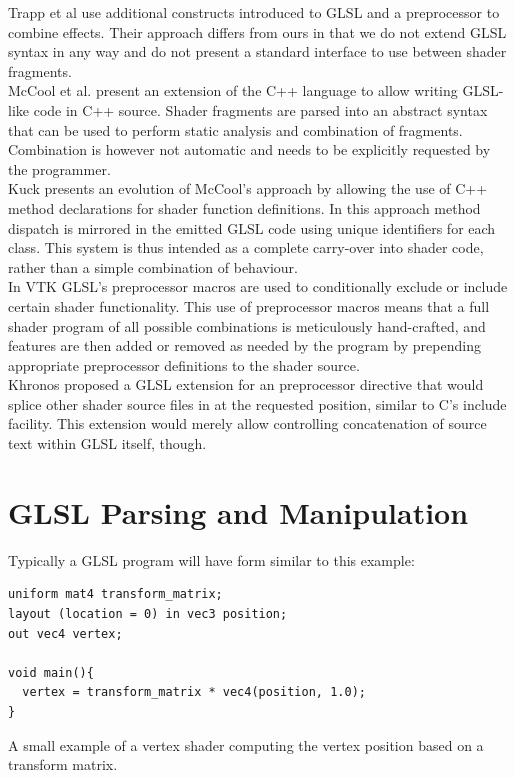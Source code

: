 \documentclass[format=sigconf]{acmart}
\begin{document}
Trapp et al\cite{trapp2007automated} use additional constructs introduced to GLSL and a preprocessor to combine effects. Their approach differs from ours in that we do not extend GLSL syntax in any way and do not present a standard interface to use between shader fragments. \\

McCool et al.\cite{mccool2002shader} present an extension of the C++ language to allow writing GLSL-like code in C++ source. Shader fragments are parsed into an abstract syntax that can be used to perform static analysis and combination of fragments. Combination is however not automatic and needs to be explicitly requested by the programmer. \\

Kuck\cite{kuck2007object} presents an evolution of McCool's approach by allowing the use of C++ method declarations for shader function definitions. In this approach method dispatch is mirrored in the emitted GLSL code using unique identifiers for each class. This system is thus intended as a complete carry-over into shader code, rather than a simple combination of behaviour. \\

In VTK\cite{vtk} GLSL's  preprocessor macros are used to conditionally exclude or include certain shader functionality. This use of preprocessor macros means that a full shader program of all possible combinations is meticulously hand-crafted, and features are then added or removed as needed by the program by prepending appropriate preprocessor definitions to the shader source. \\

Khronos proposed a GLSL extension\cite{arbinclude} for an  preprocessor directive that would splice other shader source files in at the requested position, similar to C's include facility. This extension would merely allow controlling concatenation of source text within GLSL itself, though.

\section{GLSL Parsing and Manipulation}\label{section:3}
Typically a GLSL program will have form similar to this example:

\begin{listing}[h]
\begin{verbatim}
uniform mat4 transform_matrix;
layout (location = 0) in vec3 position;
out vec4 vertex;

void main(){
  vertex = transform_matrix * vec4(position, 1.0);
}
\end{verbatim}
\caption{A small example of a vertex shader computing the vertex position based on a transform matrix.}
\label{lst:vertex}
\end{listing}
\end{document}
